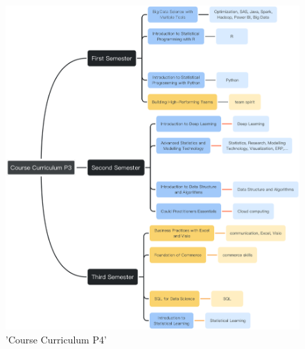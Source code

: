 \documentclass[10pt,onecolumn,letterpaper]{article}
\begin{document}
\begin{figure}[H]
  \centering
  \includegraphics[width=1\textwidth]{f11.png}
  \caption{'Course Curriculum P4'}
\end{figure}
\end{document}
